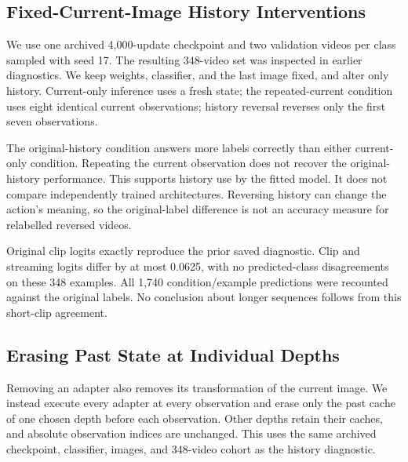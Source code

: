 \documentclass[letterpaper,10pt,conference]{ieeeconf}
\begin{document}
\subsection{Fixed-Current-Image History Interventions}
We use one archived 4,000-update checkpoint and two validation videos per
class sampled with seed 17. The resulting 348-video set was inspected in
earlier diagnostics. We keep weights, classifier, and the last image fixed,
and alter only history. Current-only inference uses a fresh state; the
repeated-current condition uses eight identical current observations;
history reversal reverses only the first seven observations.

\begin{table}[t]
\centering\small
\caption{History intervention at 4,000 updates on the same 348 videos.
Scores retain original clip labels even under altered histories.}

\end{table}
The original-history condition answers more labels correctly than either
current-only condition. Repeating the current observation does not recover
the original-history performance. This supports history use by the fitted
model. It does not compare independently trained architectures. Reversing
history can change the action's meaning, so the original-label difference
is not an accuracy measure for relabelled reversed videos.

Original clip logits exactly reproduce the prior saved diagnostic.
Clip and streaming logits differ by at most 0.0625, with no predicted-class
disagreements on these 348 examples. All 1,740 condition/example predictions
were recounted against the original labels. No conclusion about longer
sequences follows from this short-clip agreement.

\subsection{Erasing Past State at Individual Depths}
Removing an adapter also removes its transformation of the current image.
We instead execute every adapter at every observation and erase only the
past cache of one chosen depth before each observation. Other depths retain
their caches, and absolute observation indices are unchanged. This uses
the same archived checkpoint, classifier, images, and 348-video cohort as
the history diagnostic.
\end{document}
